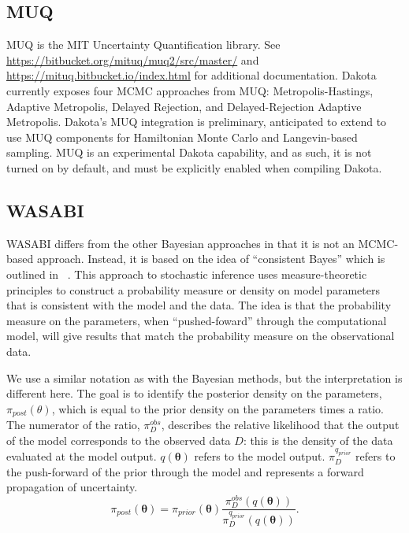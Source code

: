\subsection{MUQ}
MUQ is the MIT Uncertainty Quantification library.  See
\url{https://bitbucket.org/mituq/muq2/src/master/} and
\url{https://mituq.bitbucket.io/index.html} for additional
documentation.  Dakota currently exposes four MCMC approaches from MUQ:
Metropolis-Hastings, Adaptive Metropolis, Delayed Rejection, and
Delayed-Rejection Adaptive Metropolis. Dakota's MUQ integration
is preliminary, anticipated to extend to use MUQ components for
Hamiltonian Monte Carlo and Langevin-based sampling.  MUQ is an
experimental Dakota capability, and as such, it is not turned on by
default, and must be explicitly enabled when compiling Dakota.

\subsection{WASABI}
WASABI differs from the other Bayesian approaches in that it is 
not an MCMC-based approach.  Instead, it is based on the idea of 
``consistent Bayes'' which is outlined in ~\cite{Butler2017}.
This approach to stochastic inference uses measure-theoretic 
principles to construct a probability measure or density on model parameters
that is consistent with the model and the data.  The idea is that
the probability measure on the parameters, when ``pushed-foward'' through
the computational model, will give results that match the probability 
measure on the observational data.  

We use a similar notation as with the Bayesian methods, but the interpretation 
is different here.  The goal is to identify the posterior density on the 
parameters, $\pi_{post}({\theta})$, which is equal to the prior density on the 
parameters times a ratio.  The numerator of the ratio, $\pi_{D}^{obs}$, 
describes the relative likelihood that the output of the model corresponds 
to the observed data ${D}$:  this is the density of the data evaluated at 
the model output.  
$q(\boldsymbol{\theta})$ refers to the model output.  
$\pi_{D}^{q_{prior}}$ refers to the push-forward of the prior through the model 
and represents a forward propagation of uncertainty. 
\begin{equation}
\pi_{post}(\boldsymbol{\theta})=\pi_{prior}(\boldsymbol{\theta})\frac{\pi_{D}^{obs}(q(\boldsymbol{\theta}))}{\pi_{D}^{q_{prior}}(q(\boldsymbol{\theta}))}. 
\label{eq:consistentBayesEq}
\end{equation}

